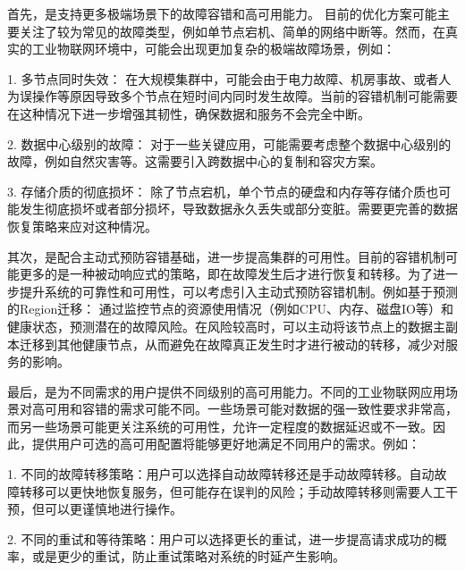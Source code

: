首先，是支持更多极端场景下的故障容错和高可用能力。 目前的优化方案可能主要关注了较为常见的故障类型，例如单节点宕机、简单的网络中断等。然而，在真实的工业物联网环境中，可能会出现更加复杂的极端故障场景，例如：

1. 多节点同时失效： 在大规模集群中，可能会由于电力故障、机房事故、或者人为误操作等原因导致多个节点在短时间内同时发生故障。当前的容错机制可能需要在这种情况下进一步增强其韧性，确保数据和服务不会完全中断。

2. 数据中心级别的故障： 对于一些关键应用，可能需要考虑整个数据中心级别的故障，例如自然灾害等。这需要引入跨数据中心的复制和容灾方案。

3. 存储介质的彻底损坏： 除了节点宕机，单个节点的硬盘和内存等存储介质也可能发生彻底损坏或者部分损坏，导致数据永久丢失或部分变脏。需要更完善的数据恢复策略来应对这种情况。

其次，是配合主动式预防容错基础，进一步提高集群的可用性。目前的容错机制可能更多的是一种被动响应式的策略，即在故障发生后才进行恢复和转移。为了进一步提升系统的可靠性和可用性，可以考虑引入主动式预防容错机制。例如基于预测的Region迁移： 通过监控节点的资源使用情况（例如CPU、内存、磁盘IO等）和健康状态，预测潜在的故障风险。在风险较高时，可以主动将该节点上的数据主副本迁移到其他健康节点，从而避免在故障真正发生时才进行被动的转移，减少对服务的影响。

最后，是为不同需求的用户提供不同级别的高可用能力。不同的工业物联网应用场景对高可用和容错的需求可能不同。一些场景可能对数据的强一致性要求非常高，而另一些场景可能更关注系统的可用性，允许一定程度的数据延迟或不一致。因此，提供用户可选的高可用配置将能够更好地满足不同用户的需求。例如：

1. 不同的故障转移策略：用户可以选择自动故障转移还是手动故障转移。自动故障转移可以更快地恢复服务，但可能存在误判的风险；手动故障转移则需要人工干预，但可以更谨慎地进行操作。

2. 不同的重试和等待策略：用户可以选择更长的重试，进一步提高请求成功的概率，或是更少的重试，防止重试策略对系统的时延产生影响。